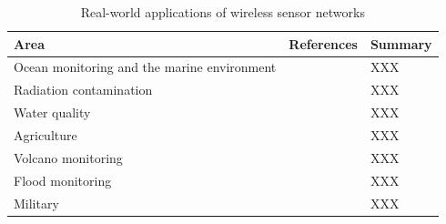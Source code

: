 \begin{table}
	\footnotesize
	\begin{tabular}{|p{}|p{}|p{}|}
		\hline
		Area & References & Summary \\
		\hline
		Ocean monitoring and the marine environment & \cite{Mahdy2008a, Albaladejo2010, 6973877} & XXX \\
		Radiation contamination & \cite{Gomez2015} & XXX \\
		Water quality & \cite{Fang2010} & XXX \\
		Agriculture  & \cite{8745854} & XXX \\
		Volcano monitoring  & \cite{Werner-Allen2006} & XXX \\
		Flood monitoring  & \cite{Castillo-effen2004} & XXX \\
		Military & \cite{6268958} & XXX \\
		\hline
	\end{tabular}
	\caption{Real-world applications of wireless sensor networks}
	\label{table:applications}	
\end{table}
